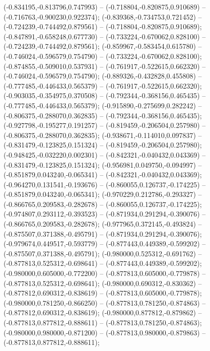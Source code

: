  (-0.834195,-0.813796,0.747993) -- (-0.718804,-0.820875,0.910689) -- (-0.716763,-0.900230,0.922374);
 (-0.839368,-0.734753,0.721452) -- (-0.724239,-0.744492,0.879561) -- (-0.718804,-0.820875,0.910689);
 (-0.847891,-0.658248,0.677730) -- (-0.733224,-0.670062,0.828100) -- (-0.724239,-0.744492,0.879561);
 (-0.859967,-0.583454,0.615780) -- (-0.746024,-0.596579,0.754790) -- (-0.733224,-0.670062,0.828100);
 (-0.874855,-0.509010,0.537931) -- (-0.761917,-0.522615,0.662320) -- (-0.746024,-0.596579,0.754790);
 (-0.889326,-0.432828,0.455808) -- (-0.777485,-0.446433,0.565379) -- (-0.761917,-0.522615,0.662320);
 (-0.903035,-0.354975,0.370508) -- (-0.792344,-0.368156,0.465435) -- (-0.777485,-0.446433,0.565379);
 (-0.915890,-0.275699,0.282242) -- (-0.806375,-0.288070,0.362835) -- (-0.792344,-0.368156,0.465435);
 (-0.927798,-0.195277,0.191257) -- (-0.819459,-0.206504,0.257980) -- (-0.806375,-0.288070,0.362835);
 (-0.938671,-0.114010,0.097837) -- (-0.831479,-0.123825,0.151324) -- (-0.819459,-0.206504,0.257980);
 (-0.948425,-0.032220,0.002301) -- (-0.842321,-0.040432,0.043369) -- (-0.831479,-0.123825,0.151324);
 (-0.956981,0.049750,-0.094997) -- (-0.851879,0.043240,-0.065341) -- (-0.842321,-0.040432,0.043369);
 (-0.964270,0.131541,-0.193676) -- (-0.860055,0.126737,-0.174225) -- (-0.851879,0.043240,-0.065341);
 (-0.970229,0.212786,-0.293327) -- (-0.866765,0.209583,-0.282678) -- (-0.860055,0.126737,-0.174225);
 (-0.974807,0.293112,-0.393523) -- (-0.871934,0.291294,-0.390076) -- (-0.866765,0.209583,-0.282678);
 (-0.977965,0.372145,-0.493824) -- (-0.875507,0.371388,-0.495791) -- (-0.871934,0.291294,-0.390076);
 (-0.979674,0.449517,-0.593779) -- (-0.877443,0.449389,-0.599202) -- (-0.875507,0.371388,-0.495791);
 (-0.980000,0.525312,-0.691762) -- (-0.877813,0.525312,-0.698641) -- (-0.877443,0.449389,-0.599202);
 (-0.980000,0.605000,-0.772200) -- (-0.877813,0.605000,-0.779878) -- (-0.877813,0.525312,-0.698641);
 (-0.980000,0.690312,-0.830362) -- (-0.877812,0.690312,-0.838619) -- (-0.877813,0.605000,-0.779878);
 (-0.980000,0.781250,-0.866250) -- (-0.877813,0.781250,-0.874863) -- (-0.877812,0.690312,-0.838619);
 (-0.980000,0.877812,-0.879862) -- (-0.877813,0.877812,-0.888611) -- (-0.877813,0.781250,-0.874863);
 (-0.980000,0.980000,-0.871200) -- (-0.877813,0.980000,-0.879863) -- (-0.877813,0.877812,-0.888611);
